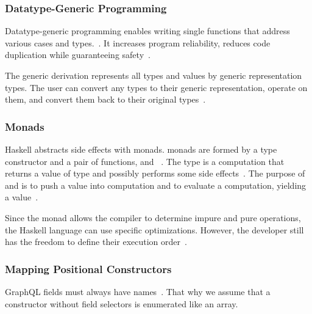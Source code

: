 

\begin{frame}[noframenumbering]\frametitle{Datatype-Generic Programming}
    
  Datatype-generic programming enables writing single functions that address various cases and types.~\cite{derivable-type-classes}. 
  It increases program reliability, reduces code duplication while guaranteeing safety~\cite{datatype-generic-programming,optimizing-generics}.
  
      
  The generic derivation represents all types and values by generic representation types. The user can convert any types to their generic representation, operate on them, and convert them back to their original types~\cite{optimizing-generics, ghc-generics}.
  
  \end{frame}

\begin{frame}[noframenumbering]\frametitle{Monads}

Haskell abstracts side effects with monads. monads are formed by a type constructor  and a pair of functions,  and \expr{>>=}~\cite{history-of-haskell,essence-of-fp}. The type  is a computation that returns a value of type  and possibly performs some side effects~\cite{history-of-haskell}. The purpose of  and \expr{>>=} is to push a value into computation and to evaluate a computation, yielding a value~\cite{essence-of-fp}.

Since the monad allows the compiler to determine impure and pure operations, the Haskell language can use specific optimizations. However, the developer still has the freedom to define their execution order~\cite{history-of-haskell}.

\end{frame}

\begin{frame}[noframenumbering]\frametitle{Mapping Positional Constructors}

  GraphQL fields must always have names~\cite{gql-spec}. That why we assume that a constructor without field selectors is enumerated like an array.
    
  
\end{frame}

